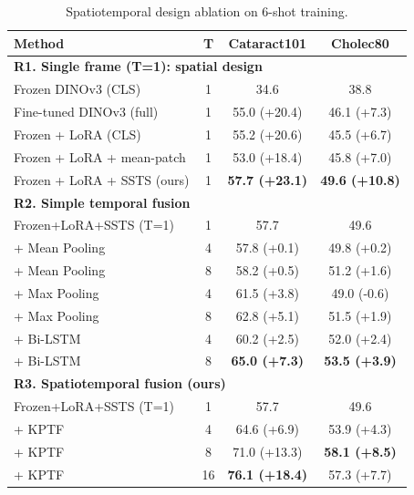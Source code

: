 \begin{table}[!ht]
\centering
\caption{Spatiotemporal design ablation on 6-shot training.}
\label{tab:temporal_modeling}
\small
\setlength{\tabcolsep}{3pt}
\begin{tabular}{l c c c}
\toprule
Method & T & Cataract101 & Cholec80 \\
\midrule
\multicolumn{4}{l}{\textbf{R1. Single frame (T=1): spatial design}} \\
\quad Frozen DINOv3 (CLS)              & 1  & 34.6            & 38.8 \\
\quad Fine-tuned DINOv3 (full)       & 1  & 55.0 {\scriptsize (+20.4)} & 46.1 {\scriptsize (+7.3)} \\
\quad Frozen + LoRA (CLS)            & 1  & 55.2 {\scriptsize (+20.6)} & 45.5 {\scriptsize (+6.7)} \\
\quad Frozen + LoRA + mean-patch     & 1  & 53.0 {\scriptsize (+18.4)} & 45.8 {\scriptsize (+7.0)} \\
\quad Frozen + LoRA + SSTS (ours)    & 1  & \textbf{57.7 {\scriptsize (+23.1)}} & \textbf{49.6 {\scriptsize (+10.8)}} \\
\midrule
\multicolumn{4}{l}{\textbf{R2. Simple temporal fusion}} \\
\quad Frozen+LoRA+SSTS (T=1)          & 1  & 57.7            & 49.6 \\
\quad + Mean Pooling   & 4  & 57.8 {\scriptsize (+0.1)}  & 49.8 {\scriptsize (+0.2)} \\
\quad + Mean Pooling   & 8  & 58.2 {\scriptsize (+0.5)}  & 51.2 {\scriptsize (+1.6)} \\
\quad + Max Pooling    & 4  & 61.5 {\scriptsize (+3.8)}  & 49.0 {\scriptsize (-0.6)} \\
\quad + Max Pooling    & 8  & 62.8 {\scriptsize (+5.1)}  & 51.5 {\scriptsize (+1.9)} \\
\quad + Bi-LSTM        & 4  & 60.2 {\scriptsize (+2.5)}  & 52.0 {\scriptsize (+2.4)} \\
\quad + Bi-LSTM        & 8  & \textbf{65.0 {\scriptsize (+7.3)}}  & \textbf{53.5 {\scriptsize (+3.9)}} \\
\midrule
\multicolumn{4}{l}{\textbf{R3. Spatiotemporal fusion (ours)}} \\
\quad Frozen+LoRA+SSTS (T=1)          & 1  & 57.7            & 49.6 \\
\quad + KPTF           & 4  & 64.6 {\scriptsize (+6.9)}  & 53.9 {\scriptsize (+4.3)} \\
\quad + KPTF           & 8  & 71.0 {\scriptsize (+13.3)}  & \textbf{58.1 {\scriptsize (+8.5)}} \\
\quad + KPTF           & 16 & \textbf{76.1 {\scriptsize (+18.4)}}  & 57.3 {\scriptsize (+7.7)} \\
\bottomrule
\end{tabular}
\end{table}
